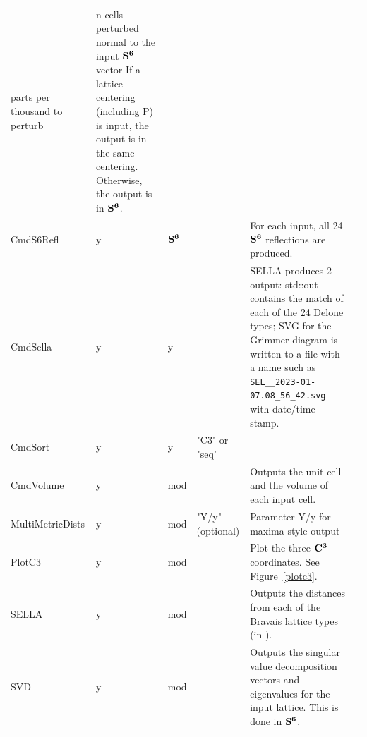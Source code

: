 \documentclass[preprint]{iucr}              %
\numberwithin{equation}{section}
\newcommand{\SVI}[0]{$\bf{S^{6}}$}
\newcommand{\CIII}[0]{$\bf{C^{3}}$}
\begin{document}
\begin{longtable}{l l l p{} p{} l}
				parts per thousand to perturb			&
				n cells perturbed normal to the input \SVI{} vector
				If a lattice centering (including P) is input,
				the output is in the same centering. Otherwise, the output is in \SVI{}.	\\[.9pt]
			CmdS6Refl	&	y	&	\SVI{}	&\hrulefill	&	For each input, 
				all 24 \SVI{} reflections are produced.\\[.9pt]
			CmdSella	&	y	&	y		&\hrulefill	&
				SELLA produces 2 output: std::out contains the match of
				each of the 24 Delone types; SVG for the Grimmer
				diagram is written to a file with a name such as 
					\verb#SEL__2023-01-07.08_56_42.svg# with date/time stamp.\\
			CmdSort		&	y	&	y		&"C3" or "seq'&	\\[.9pt]
			CmdVolume	&	y	&	mod		&\hrulefill	&		Outputs the unit cell 
				and the volume of each input cell.\\[.9pt]
			MultiMetricDists&y	& mod		&"Y/y"(optional)&	
				Parameter Y/y for maxima style output		\\[.9pt]
			PlotC3		&	y	&	mod		& \hrulefill	& Plot 
				the three \CIII{} coordinates. See Figure~\ref{plotc3}.\\[.9pt]
			SELLA		&	y	&	mod		&\hrulefill	&	
				Outputs the distances from each of the Bravais lattice types 
				(in \svi{}).	\\[.9pt]
			SVD			&	y	&	mod		&\hrulefill	& Outputs the singular value decomposition vectors
				and eigenvalues for the input lattice. This is done in \SVI{}.		\\[.9pt]			
			\bottomrule
			
		\end{longtable}
	
\end{document}
